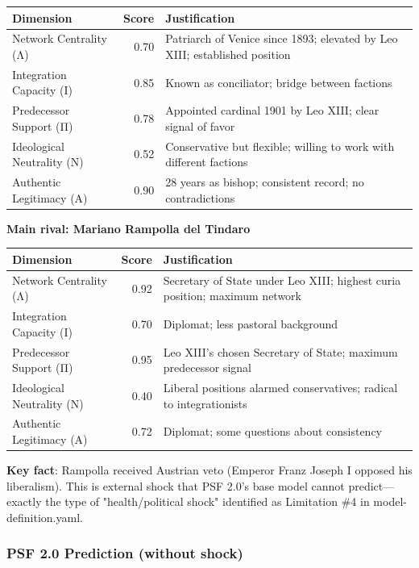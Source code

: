 \documentclass[11pt,a4paper]{article}
\begin{document}
\begin{center}
\begin{tabular}{lrp{4cm}}
\toprule
\textbf{Dimension} & \textbf{Score} & \textbf{Justification} \\
\midrule
Network Centrality (Λ) & 0.70 & Patriarch of Venice since 1893; elevated by Leo XIII; established position \\
Integration Capacity (Ι) & 0.85 & Known as conciliator; bridge between factions \\
Predecessor Support (Π) & 0.78 & Appointed cardinal 1901 by Leo XIII; clear signal of favor \\
Ideological Neutrality (Ν) & 0.52 & Conservative but flexible; willing to work with different factions \\
Authentic Legitimacy (Α) & 0.90 & 28 years as bishop; consistent record; no contradictions \\
\bottomrule
\end{tabular}
\end{center}

\textbf{Main rival: Mariano Rampolla del Tindaro}

\begin{center}
\begin{tabular}{lrp{4cm}}
\toprule
\textbf{Dimension} & \textbf{Score} & \textbf{Justification} \\
\midrule
Network Centrality (Λ) & 0.92 & Secretary of State under Leo XIII; highest curia position; maximum network \\
Integration Capacity (Ι) & 0.70 & Diplomat; less pastoral background \\
Predecessor Support (Π) & 0.95 & Leo XIII's chosen Secretary of State; maximum predecessor signal \\
Ideological Neutrality (Ν) & 0.40 & Liberal positions alarmed conservatives; radical to integrationists \\
Authentic Legitimacy (Α) & 0.72 & Diplomat; some questions about consistency \\
\bottomrule
\end{tabular}
\end{center}

\textbf{Key fact}: Rampolla received Austrian veto (Emperor Franz Joseph I opposed his liberalism). This is external shock that PSF 2.0's base model cannot predict---exactly the type of "health/political shock" identified as Limitation \#4 in model-definition.yaml.

\subsubsection{PSF 2.0 Prediction (without shock)}
\end{document}
